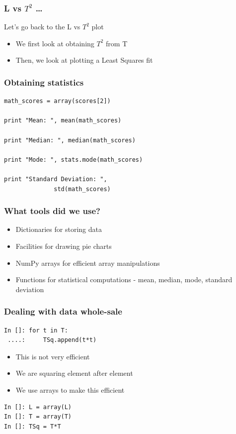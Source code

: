 \documentclass[14pt,compress]{beamer}
\begin{document}
\begin{frame}
\frametitle{L vs $T^2$ \ldots}
Let's go back to the L vs $T^2$ plot
\begin{itemize}
\item We first look at obtaining $T^2$ from T
\item Then, we look at plotting a Least Squares fit
\end{itemize}
\end{frame}

\begin{frame}[fragile]
  \frametitle{Obtaining statistics}
  \begin{lstlisting}
math_scores = array(scores[2])

print "Mean: ", mean(math_scores)

print "Median: ", median(math_scores)

print "Mode: ", stats.mode(math_scores)

print "Standard Deviation: ",
              std(math_scores)
  \end{lstlisting}
\end{frame}

\begin{frame}[fragile]
  \frametitle{What tools did we use?}
  \begin{itemize}
   \item Dictionaries for storing data
   \item Facilities for drawing pie charts
   \item NumPy arrays for efficient array manipulations
   \item Functions for statistical computations - mean, median, mode, standard deviation
  \end{itemize}
\end{frame}

\begin{frame}[fragile]
\frametitle{Dealing with data whole-sale}
\begin{lstlisting}
In []: for t in T:
 ....:     TSq.append(t*t)
\end{lstlisting}
\begin{itemize}
\item This is not very efficient
\item We are squaring element after element
\item We use arrays to make this efficient
\end{itemize}
\begin{lstlisting}
In []: L = array(L)
In []: T = array(T)
In []: TSq = T*T
\end{lstlisting}
\end{frame}
\end{document}
